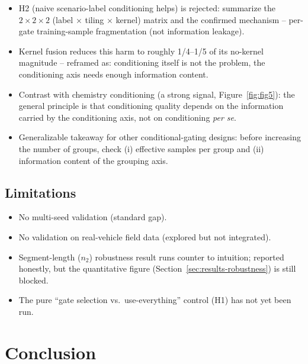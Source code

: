 \documentclass[preprint,12pt]{elsarticle}
\begin{document}
\begin{itemize}
  \item H2 (naive scenario-label conditioning helps) is rejected: summarize the $2\times2\times2$ (label $\times$ tiling $\times$ kernel) matrix and the confirmed mechanism -- per-gate training-sample fragmentation (not information leakage).
  \item Kernel fusion reduces this harm to roughly 1/4--1/5 of its no-kernel magnitude -- reframed as: conditioning itself is not the problem, the conditioning axis needs enough information content.
  \item Contrast with chemistry conditioning (a strong signal, Figure~\ref{fig:fig5}): the general principle is that conditioning quality depends on the information carried by the conditioning axis, not on conditioning \emph{per se}.
  \item Generalizable takeaway for other conditional-gating designs: before increasing the number of groups, check (i) effective samples per group and (ii) information content of the grouping axis.
\end{itemize}

\subsection{Limitations}
\label{sec:limitations}

\begin{itemize}
  \item No multi-seed validation (standard gap).
  \item No validation on real-vehicle field data (explored but not integrated).
  \item Segment-length ($n_2$) robustness result runs counter to intuition; reported honestly, but the quantitative figure (Section~\ref{sec:results-robustness}) is still blocked.
  \item The pure ``gate selection vs.\ use-everything'' control (H1) has not yet been run.
\end{itemize}

\section{Conclusion}
\end{document}
